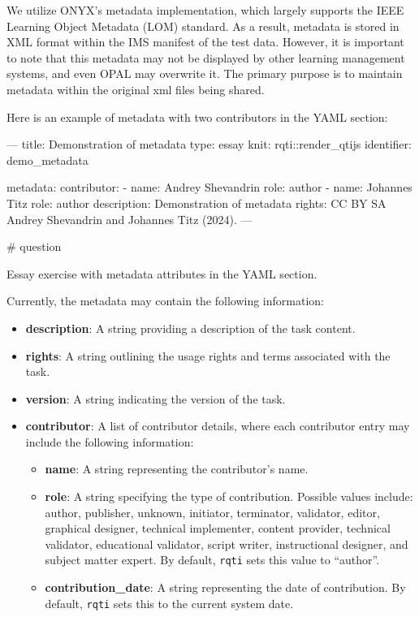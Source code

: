 \documentclass[twoside]{tufte-book}
\newenvironment{Shaded}{}{}
\providecommand{\tightlist}{%
  \setlength{\itemsep}{0pt}\setlength{\parskip}{0pt}}
\begin{document}
We utilize ONYX's metadata implementation, which largely supports the IEEE Learning Object Metadata (LOM) standard. As a result, metadata is stored in XML format within the IMS manifest of the test data. However, it is important to note that this metadata may not be displayed by other learning management systems, and even OPAL may overwrite it. The primary purpose is to maintain metadata within the original xml files being shared.

Here is an example of metadata with two contributors in the YAML section:

\begin{Shaded}
\begin{Highlighting}
---
title: Demonstration of metadata
type: essay
knit: rqti::render_qtijs
identifier: demo_metadata

metadata:
  contributor:
    - name: Andrey Shevandrin
      role: author
    - name: Johannes Titz
      role: author
  description: Demonstration of metadata
  rights: CC BY SA Andrey Shevandrin and Johannes Titz (2024).
---

# question

Essay exercise with metadata attributes in the YAML section.
\end{Highlighting}
\end{Shaded}

Currently, the metadata may contain the following information:

\begin{itemize}
\tightlist
\item
  \textbf{description}: A string providing a description of the task content.
\item
  \textbf{rights}: A string outlining the usage rights and terms associated with the task.
\item
  \textbf{version}: A string indicating the version of the task.
\item
  \textbf{contributor}: A list of contributor details, where each contributor entry may include the following information:

  \begin{itemize}
  \tightlist
  \item
    \textbf{name}: A string representing the contributor's name.
  \item
    \textbf{role}: A string specifying the type of contribution. Possible values include: author, publisher, unknown, initiator, terminator, validator, editor, graphical designer, technical implementer, content provider, technical validator, educational validator, script writer, instructional designer, and subject matter expert. By default, \texttt{rqti} sets this value to ``author''.
  \item
    \textbf{contribution\_date}: A string representing the date of contribution. By default, \texttt{rqti} sets this to the current system date.
  \end{itemize}
\end{itemize}
\end{document}
